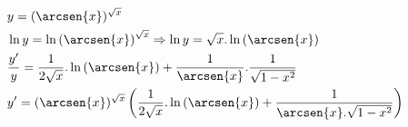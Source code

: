 \begin{ex}
\begin{align}
&y=(\arcsen{x})^{\sqrt{x}}\nonumber\\
&\ln{y}=\ln{(\arcsen{x})}^{\sqrt{x}} \Rightarrow \ln{y}=\sqrt{x}.\ln{(\arcsen{x})}\nonumber\\
&\frac{y'}{y}=\frac{1}{2\sqrt{x}}.\ln{(\arcsen{x})}+\frac{1}{\arcsen{x}}.\frac{1}{\sqrt{1-x^2}}\nonumber\\
&y'=(\arcsen{x})^{\sqrt{x}}\left(\frac{1}{2\sqrt{x}}.\ln{(\arcsen{x})}+\frac{1}{\arcsen{x}.\sqrt{1-x^2}}\right)\nonumber
\end{align}
\end{ex}